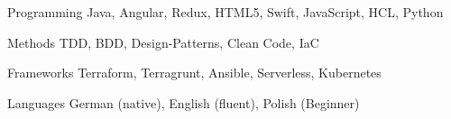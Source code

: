 

\begin{cvskills}

  \cvskill
    {Programming} %
    {Java, Angular, Redux, HTML5, Swift, JavaScript, HCL, Python} %

  \cvskill
    {Methods} %
    {TDD, BDD, Design-Patterns, Clean Code, IaC} %

  \cvskill
    {Frameworks} %
    {Terraform, Terragrunt, Ansible, Serverless, Kubernetes} %


  \cvskill
    {Languages} %
    {German (native), English (fluent), Polish (Beginner)} %


\end{cvskills}
